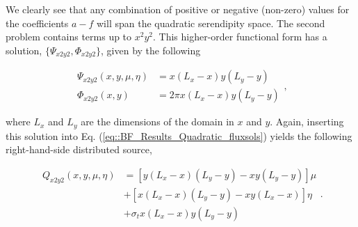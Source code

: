 \noindent We clearly see that any combination of positive or negative (non-zero) values for the coefficients $a-f$ will span the quadratic serendipity space. The second problem contains terms up to $x^2 y^2$. This higher-order functional form has a solution, $\{ \Psi_{x2y2}, \Phi_{x2y2}\}$, given by the following

\begin{equation}
\label{eq::BF_Results_x2y2_fluxsols}
\begin{aligned}
\Psi_{x2y2} (x,y,\mu,\eta) &= x \left(L_x - x \right) y \left(L_y - y \right) \\
\Phi_{x2y2} (x,y) &= 2 \pi x \left(L_x - x \right) y \left(L_y - y \right) 
\end{aligned} ,
\end{equation}

\noindent where $L_x$ and $L_y$ are the dimensions of the domain in $x$ and $y$. Again, inserting this solution into Eq. (\ref{eq::BF_Results_Quadratic_fluxsols}) yields the following right-hand-side distributed source,

\begin{equation}
\label{eq::BF_Results_x2y2_rhs}
\begin{aligned}
Q_{x2y2} (x,y,\mu,\eta) &=  \left[ y\left( L_x-x \right)\left( L_y-y \right) - xy\left( L_y-y \right) \right] \mu \\
&+ \left[ x\left( L_x-x \right) \left( L_y-y \right) - xy\left( L_x-x \right) \right] \eta \\
&+ \sigma_t x \left(L_x - x \right) y \left(L_y - y \right)
\end{aligned} .
\end{equation}

